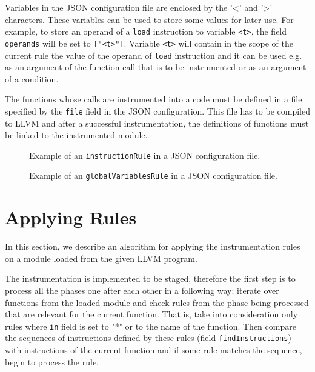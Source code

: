Variables in the JSON configuration file are enclosed by the '<' and '>'
characters. These variables can be used to store some values for later use. For
example, to store an operand of a \texttt{load} instruction to variable
\texttt{<t>}, the field \texttt{operands} will be set to \texttt{["<t>"]}.
Variable \texttt{<t>} will contain in the scope of the current rule the value
of the operand of \texttt{load} instruction and it can be used e.g. as an
argument of the function call that is to be instrumented or as an argument of a
condition.

The functions whose calls are instrumented into a code must be defined in a
file specified by the \texttt{file} field in the JSON configuration. This file
has to be compiled to LLVM and after a successful instrumentation, the
definitions of functions must be linked to the instrumented module.

\begin{figure}[h]

\caption{Example of an \texttt{instructionRule} in a JSON configuration file.}
\label{fig:json_example}
\end{figure}

\begin{figure}[h]

\caption{Example of an \texttt{globalVariablesRule} in a JSON configuration file.}
\label{fig:json_example2}
\end{figure}


\section{Applying Rules}

In this section, we describe an algorithm for applying the instrumentation
rules on a module loaded from the given LLVM program.


The instrumentation is implemented to be staged, therefore the first step is to
process all the phases one after each other in a following way: iterate over
functions from the loaded module and check rules from the phase being processed
that are relevant for the current function. That is, take into consideration
only rules where \texttt{in} field is set to "*" or to the name of the
function. Then compare the sequences of instructions defined by these rules
(field \texttt{findInstructions}) with instructions of the current function and
if some rule matches the sequence, begin to process the rule.

